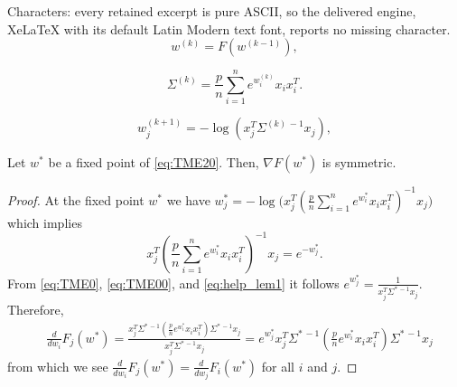 \documentclass[10pt,a4paper]{amsart}
\begin{document}
Characters: every retained excerpt is pure ASCII, so the delivered engine, XeLaTeX with its default Latin Modern text font, reports no missing character.
\begin{equation}\label{eq:TME20}
w^{(k)}={F}(w^{(k-1)}),
\end{equation} 

\begin{equation}\label{eq:TME0}
\Sigma^{(k)}=\frac{p}{n}\sum_{i=1}^ne^{w_i^{(k)}}x_i x_i^T.
\end{equation}

\begin{equation}\label{eq:TME00}
w_j^{(k+1)}=-\log(x_j^T\Sigma^{(k)\,-1}x_j),
\end{equation}

\begin{lemma}
\label{lemma:tme_via_teng}
Let ${w}^*$  be a fixed point of \eqref{eq:TME20}. Then, $\nabla {F}(w^*)$ is symmetric.
\end{lemma}

\begin{proof}
At the fixed point $w^*$ we have
$
w_j^*=-\log\Big(x_j^T(\frac{p}{n}\sum_{i=1}^ne^{w_i^*}x_i x_i^T)^{-1}x_j\Big)
$
which implies
\begin{equation}\label{eq:help_lem1}
x_j^T\left(\frac{p}{n}\sum_{i=1}^ne^{w_i^*}x_i x_i^T\right)^{-1}x_j=e^{-w_j^*}.
\end{equation}
From \eqref{eq:TME0}, \eqref{eq:TME00}, and \eqref{eq:help_lem1} it follows
$
e^{w_j^*}=\frac{1}{x_j^T\Sigma^{*\,-1}x_j}. 
$
Therefore,
\begin{align*}
&\frac{d}{d w_i}F_j(w^*)=\frac{x_j^T\Sigma^{*\,-1}(\frac{p}{n}e^{w_i^*}x_i x_i^T)\Sigma^{*\,-1} x_j}{x_j^T\Sigma^{*\,-1}x_j}
={e^{w_j^*}x_j^T\Sigma^{*\,-1}\left(\frac{p}{n}e^{w_i^*}x_i x_i^T\right)\Sigma^{*\,-1}x_j}
\end{align*}
from which we see $\frac{d}{d w_i}F_j(w^*)=\frac{d}{d w_j}F_i(w^*)$ for all $i$ and $j$.
\end{proof}
\end{document}
